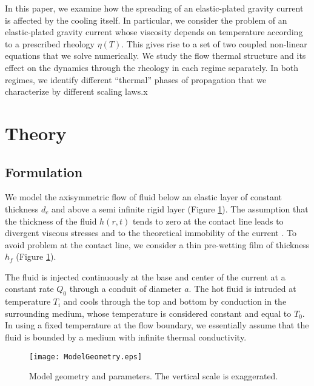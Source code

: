 In  this paper,  we examine  how  the spreading  of an  elastic-plated
gravity current is affected by  the cooling itself.  In particular, we
consider  the  problem  of  an elastic-plated  gravity  current  whose
viscosity depends  on temperature  according to a  prescribed rheology
$\eta(T)$.   This  gives rise  to  a  set  of two  coupled  non-linear
equations  that  we solve  numerically.   We  study the  flow  thermal
structure and its effect on the  dynamics through the rheology in each
regime separately.  In both regimes, we identify different ``thermal''
phases of propagation that we characterize by different scaling laws.x

\section{Theory}
\label{C3-sec:theory}

\subsection{Formulation}
\label{C3-sec:formulation}

We model  the axisymmetric  flow of  fluid below  an elastic  layer of
constant thickness $d_c$ and above a semi infinite rigid layer (Figure
\ref{C3-Figure2-1}).  The  assumption that the thickness  of the fluid
$h(r,t)$ tends to zero at the  contact line leads to divergent viscous
stresses   and  to   the   theoretical  immobility   of  the   current
\citep{Flitton:1999iv}.   To avoid  problem  at the  contact line,  we
consider    a   thin    pre-wetting    film    of   thickness    $h_f$
\citep{Lister:2013ia} (Figure \ref{C3-Figure2-1}).

The  fluid is  injected continuously  at the  base and  center of  the
current  at  a constant  rate  $Q_0$  through  a conduit  of  diameter
$a$. The hot fluid is intruded  at temperature $T_i$ and cools through
the  top and  bottom by  conduction in  the surrounding  medium, whose
temperature is  considered constant  and equal to  $T_0$.  In  using a
fixed temperature at the flow boundary, we essentially assume that the
fluid is bounded by a medium with infinite thermal conductivity.

\begin{figure}
  \begin{center}
    \graphicspath{ {/Users/thorey/Documents/These/Projet/Refroidissement/Skin_Model/Figure/JFM_V13/} }
    \texttt{[image: ModelGeometry.eps]}
    \caption{Model  geometry and  parameters.  The  vertical scale  is
      exaggerated.}
    \label{C3-Figure2-1}
  \end{center}
\end{figure}

